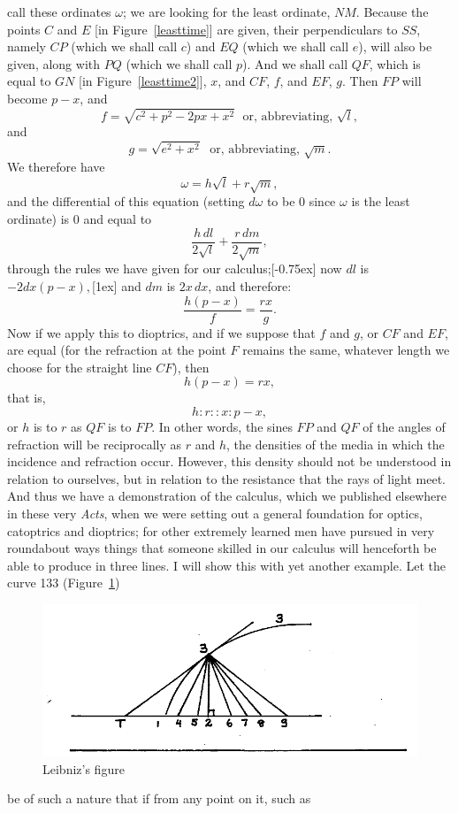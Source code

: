 \documentclass[twoside,openright]{article}
\begin{document}
call these ordinates $\omega$; we are looking for the least ordinate,
$NM$.  Because the points $C$ and $E$ [in Figure~\ref{leasttime}] are
given, their perpendiculars to $SS$, namely $CP$ (which we shall call
$c$) and $EQ$ (which we shall call $e$), will also be given, along
with $PQ$ (which we shall call $p$).  And we shall call $QF$, which is
equal to $GN$ [in Figure~\ref{leasttime2}], $x$, and $CF$, $f$, and
$EF$, $g$.  Then $FP$ will become $p-x$, and
$$f  = \sqrt{c^2+p^2-2px + x^2}\;\mbox{ or, abbreviating, }\sqrt{l},$$
and
$$g =  \sqrt{e^2+x^2}\;\mbox{ or, abbreviating, }\sqrt{m}.$$ We
therefore have
$$\omega =  h\sqrt{l} + r\sqrt{m},
$$ and the differential of this
equation (setting $d\omega$ to be 0 since $\omega$ is the least
ordinate) is 0 and equal to
$$\frac{h\,dl}{2\sqrt{l}} + \frac{r\,dm}{2\sqrt{m}},$$ through the rules we have
given for our calculus;[-0.75ex] now
$dl$ is $-2dx(p-x),$[1ex] and $dm$
is $2x\,dx$, and therefore:
$$\frac{h(p-x)}{f} = \frac{rx}{g}. $$ Now if we apply this
to dioptrics, and if we suppose that $f$ and $g$, or $CF$ and $EF$,
are equal (for the refraction at the point $F$ remains the same,
whatever length we choose for the straight line $CF$), then
$$h(p-x) = rx,$$ that is,
$$h\!:\!r::x\!:\!p-x,$$ or $h$ is to $r$ as $QF$ is to $FP$.  In other words,
the sines $FP$ and $QF$ of the angles of refraction will be
reciprocally as $r$ and $h$, the densities of the media in which the
incidence and refraction occur.
However, this density should not be understood in relation to
ourselves, but in relation to the resistance that the rays of light
meet.  And thus we have a demonstration of the calculus, which we
published elsewhere in these very {\em Acts}, when we were setting out
a general foundation for optics, catoptrics and
dioptrics; for other extremely
learned men have pursued in very roundabout ways things that someone
skilled in our calculus will henceforth be able to produce in three
lines.\label{enmex2} \label{bnmex3} I will show this with yet another
example.  Let the curve 133 (Figure~\ref{locus})
\begin{figure}[htp]
  \begin{center}
    \includegraphics[width=\textwidth]{fig/Figure24}
    \caption{Leibniz's figure}
    \label{locus}
  \end{center}
\end{figure} be of such a nature that if from any point on it, such as
\end{document}
